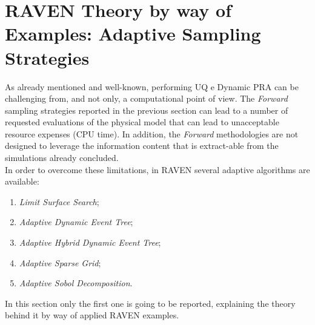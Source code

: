 \section{RAVEN Theory by way of Examples: Adaptive Sampling Strategies}
As already mentioned and well-known, performing UQ e Dynamic PRA can be
challenging from, and not only, a computational point of view. The \textit{Forward}
sampling strategies reported in the previous section can lead to a number of
requested evaluations of the physical model that can lead to unacceptable resource expenses (CPU time).
In addition, the \textit{Forward} methodologies are not designed to leverage the information
content that is extract-able from the simulations already concluded.
\\In order to overcome these limitations, in RAVEN several adaptive algorithms are available:
\begin{enumerate}
  \item \textit{Limit Surface Search};
  \item \textit{Adaptive Dynamic Event Tree};
  \item \textit{Adaptive Hybrid Dynamic Event Tree};
  \item \textit{Adaptive Sparse Grid};
  \item \textit{Adaptive Sobol Decomposition}.
\end{enumerate}
In this section only the first one is going to be reported, explaining the theory behind it
by way of applied RAVEN examples.

